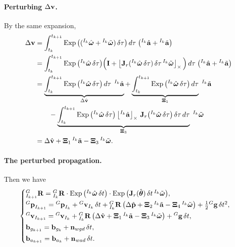 \paragraph{Perturbing $\Delta\boldsymbol{\mathbf{v}}$.} By the same expansion,
\begin{align}
\Delta\boldsymbol{\mathbf{v}}
&= \int_{t_k}^{t_{k+1}} \operatorname{Exp}\big(({}^{I_k}\hat{\boldsymbol{\mathbf{\omega}}} + {}^{I_k}\tilde{\boldsymbol{\mathbf{\omega}}})\,\delta\tau\big)\,d\tau\;\big({}^{I_k}\hat{\boldsymbol{\mathbf{a}}} + {}^{I_k}\tilde{\boldsymbol{\mathbf{a}}}\big) \\
&= \int_{t_k}^{t_{k+1}} \operatorname{Exp}\big({}^{I_k}\hat{\boldsymbol{\mathbf{\omega}}}\,\delta\tau\big)\Big(\boldsymbol{\mathbf{I}} + \left\lfloor\boldsymbol{\mathbf{J}}_r({}^{I_k}\hat{\boldsymbol{\mathbf{\omega}}}\,\delta\tau)\,\delta\tau\,{}^{I_k}\tilde{\boldsymbol{\mathbf{\omega}}}\right\rfloor_{\times}\Big)\,d\tau\;\big({}^{I_k}\hat{\boldsymbol{\mathbf{a}}} + {}^{I_k}\tilde{\boldsymbol{\mathbf{a}}}\big) \\
&= \underbrace{\int_{t_k}^{t_{k+1}} \operatorname{Exp}\big({}^{I_k}\hat{\boldsymbol{\mathbf{\omega}}}\,\delta\tau\big)\,d\tau\,\;{}^{I_k}\hat{\boldsymbol{\mathbf{a}}}}_{\Delta\hat{\boldsymbol{\mathbf{v}}}}
+ \underbrace{\int_{t_k}^{t_{k+1}} \operatorname{Exp}\big({}^{I_k}\hat{\boldsymbol{\mathbf{\omega}}}\,\delta\tau\big)\,d\tau}_{\boldsymbol{\mathbf{\Xi}}_1}\;{}^{I_k}\tilde{\boldsymbol{\mathbf{a}}} \notag\\
&\qquad - \underbrace{\int_{t_k}^{t_{k+1}} \operatorname{Exp}\big({}^{I_k}\hat{\boldsymbol{\mathbf{\omega}}}\,\delta\tau\big)\left\lfloor{}^{I_k}\hat{\boldsymbol{\mathbf{a}}}\right\rfloor_{\times}\,\boldsymbol{\mathbf{J}}_r\big({}^{I_k}\hat{\boldsymbol{\mathbf{\omega}}}\,\delta\tau\big)\,\delta\tau\,d\tau}_{\boldsymbol{\mathbf{\Xi}}_3}\;{}^{I_k}\tilde{\boldsymbol{\mathbf{\omega}}} \\
&= \Delta\hat{\boldsymbol{\mathbf{v}}} + \boldsymbol{\mathbf{\Xi}}_1\,{}^{I_k}\tilde{\boldsymbol{\mathbf{a}}} - \boldsymbol{\mathbf{\Xi}}_3\,{}^{I_k}\tilde{\boldsymbol{\mathbf{\omega}}}.
\end{align}

\paragraph{The perturbed propagation.} Then we have
\begin{align}
\begin{cases}
{}^{G}_{I_{k+1}}\boldsymbol{\mathbf{R}} = {}^{G}_{I_k}\boldsymbol{\mathbf{R}}\cdot\operatorname{Exp}\big({}^{I_k}\hat{\boldsymbol{\mathbf{\omega}}}\,\delta t\big)\cdot\operatorname{Exp}\big(\boldsymbol{\mathbf{J}}_r(\hat{\boldsymbol{\mathbf{\theta}}})\,\delta t\,{}^{I_k}\tilde{\boldsymbol{\mathbf{\omega}}}\big), \\[2pt]
{}^{G}\boldsymbol{\mathbf{p}}_{I_{k+1}} = {}^{G}\boldsymbol{\mathbf{p}}_{I_k} + {}^{G}\boldsymbol{\mathbf{v}}_{I_k}\,\delta t + {}^{G}_{I_k}\boldsymbol{\mathbf{R}}\,\big(\Delta\hat{\boldsymbol{\mathbf{p}}} + \boldsymbol{\mathbf{\Xi}}_2\,{}^{I_k}\tilde{\boldsymbol{\mathbf{a}}} - \boldsymbol{\mathbf{\Xi}}_4\,{}^{I_k}\tilde{\boldsymbol{\mathbf{\omega}}}\big) + \frac{1}{2}{}^{G}\boldsymbol{\mathbf{g}}\,\delta t^2, \\[2pt]
{}^{G}\boldsymbol{\mathbf{v}}_{I_{k+1}} = {}^{G}\boldsymbol{\mathbf{v}}_{I_k} + {}^{G}_{I_k}\boldsymbol{\mathbf{R}}\,\big(\Delta\hat{\boldsymbol{\mathbf{v}}} + \boldsymbol{\mathbf{\Xi}}_1\,{}^{I_k}\tilde{\boldsymbol{\mathbf{a}}} - \boldsymbol{\mathbf{\Xi}}_3\,{}^{I_k}\tilde{\boldsymbol{\mathbf{\omega}}}\big) + {}^{G}\boldsymbol{\mathbf{g}}\,\delta t, \\[2pt]
\boldsymbol{\mathbf{b}}_{g_{k+1}} = \boldsymbol{\mathbf{b}}_{g_k} + \boldsymbol{\mathbf{n}}_{wgd}\,\delta t, \\[2pt]
\boldsymbol{\mathbf{b}}_{a_{k+1}} = \boldsymbol{\mathbf{b}}_{a_k} + \boldsymbol{\mathbf{n}}_{wad}\,\delta t.
\end{cases}
\end{align}

